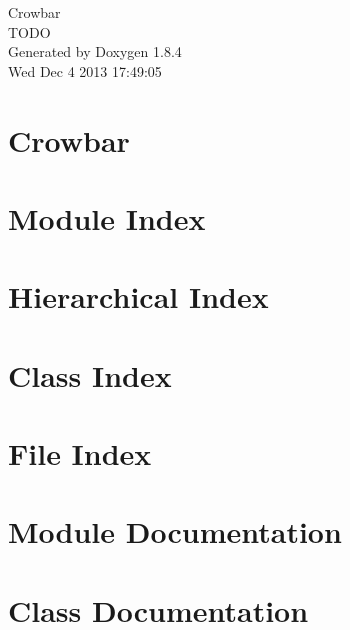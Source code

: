 \documentclass[twoside]{book}
\newcommand{\clearemptydoublepage}{%
  \newpage{\pagestyle{empty}\cleardoublepage}%
}
\begin{document}
\hypersetup{pageanchor=false}
\begin{titlepage}
\vspace*{7cm}
\begin{center}%
{\Large Crowbar \\[1ex]\large T\-O\-D\-O }\\
\vspace*{1cm}
{\large Generated by Doxygen 1.8.4}\\
\vspace*{0.5cm}
{\small Wed Dec 4 2013 17:49:05}\\
\end{center}
\end{titlepage}
\clearemptydoublepage
\tableofcontents
\clearemptydoublepage
{}
\hypersetup{pageanchor=true}

\chapter{Crowbar}
\label{md_README}
\hypertarget{md_README}{}

\chapter{Module Index}

\chapter{Hierarchical Index}

\chapter{Class Index}

\chapter{File Index}

\chapter{Module Documentation}


\chapter{Class Documentation}
























\end{document}

